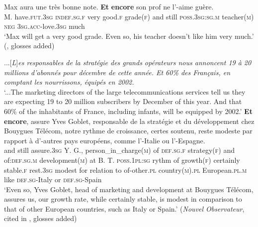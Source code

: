 \begin{exe}
	\ex
	\gll Max aura une très bonne note. \textbf{Et} \textbf{encore} son prof ne l'-aime guère.\\
	M. have.\textsc{fut}.3\textsc{sg} \textsc{indef}.\textsc{sg}.\textsc{f} very good.\textsc{f} grade(\textsc{f}) and still \textsc{poss}.3\textsc{sg}:\textsc{sg}.\textsc{m} teacher(\textsc{m}) \textsc{neg} 3\textsc{sg}.\textsc{acc}-love.3\textsc{sg} much\\
	\glt \lq Max will get a very good grade. Even so, his teacher doesn’t like him very much.\rq{ }(\cite[195]{MosegaardHansen2008}, glosses added)

	\ex
	...[\textit{L}]\textit{es responsables de la stratégie des grands opérateurs nous annoncent 19 à 20 millions d’abonnés pour décembre de cette année. Et 60\% des Français, en comptant les nourrissons, équipés en 2002.}\\
	\lq ...The marketing directors of the large telecommunications services tell us they are expecting 19 to 20 million subscribers by December of this year. And that 60\% of the inhabitants of France, including infants, will be equipped by 2002.'
	\exi{}\gll \textbf{Et} \textbf{encore}, assure Yves Goblet, responsable de la stratégie et du développement chez Bouygues Télécom, notre rythme de croissance, certes soutenu, reste modeste par rapport à d’-autres pays européens, comme l’-Italie ou l’-Espagne.\\
	and still assure.3\textsc{sg} Y. G., person\_in\_charge(\textsc{m}) of \textsc{def}.\textsc{sg}.\textsc{f} strategy(\textsc{f}) and of:\textsc{def}.\textsc{sg}.\textsc{m} development(\textsc{m}) at B. T. \textsc{poss}.1\textsc{pl}:\textsc{sg} rythm of growth(\textsc{f}) certainly stable.\textsc{f} rest.3\textsc{sg} modest for relation to of-other.\textsc{pl} country(\textsc{m}).\textsc{pl} European.\textsc{pl}.\textsc{m} like \textsc{def}.\textsc{sg}-Italy or \textsc{def}.\textsc{sg}-Spain\\
	\glt \lq Even so, Yves Goblet, head of marketing and development at Bouygues Télécom, assures us, our growth rate, while certainly stable, is modest in comparison to that of other European countries, such as Italy or Spain.' (\textit{Nouvel Observateur}, cited in \cite[193]{MosegaardHansen2008}, glosses added)
\end{exe}

